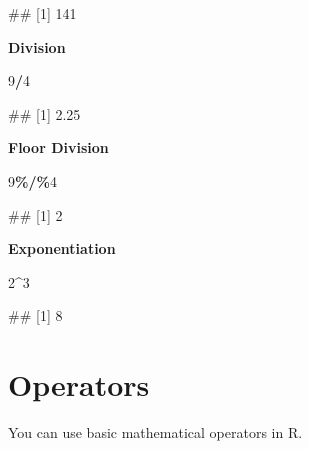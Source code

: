 \documentclass[
]{book}
\newenvironment{Shaded}{\begin{snugshade}}{\end{snugshade}}
\newcommand{\DecValTok}[1]{\textcolor[rgb]{0.00,0.00,0.81}{#1}}
\newcommand{\NormalTok}[1]{#1}
\newcommand{\SpecialCharTok}[1]{\textcolor[rgb]{0.81,0.36,0.00}{\textbf{#1}}}
\begin{document}
\begin{Shaded}
\begin{Highlighting}[]
\NormalTok{\#\# [1] 141}
\end{Highlighting}
\end{Shaded}

\textbf{Division}

\begin{Shaded}
\begin{Highlighting}[]
\DecValTok{9}\SpecialCharTok{/}\DecValTok{4}
\end{Highlighting}
\end{Shaded}

\begin{Shaded}
\begin{Highlighting}[]
\NormalTok{\#\# [1] 2.25}
\end{Highlighting}
\end{Shaded}

\textbf{Floor Division}

\begin{Shaded}
\begin{Highlighting}[]
\DecValTok{9}\SpecialCharTok{\%/\%}\DecValTok{4}
\end{Highlighting}
\end{Shaded}

\begin{Shaded}
\begin{Highlighting}[]
\NormalTok{\#\# [1] 2}
\end{Highlighting}
\end{Shaded}

\textbf{Exponentiation}

\begin{Shaded}
\begin{Highlighting}[]
\DecValTok{2}\SpecialCharTok{\^{}}\DecValTok{3}
\end{Highlighting}
\end{Shaded}

\begin{Shaded}
\begin{Highlighting}[]
\NormalTok{\#\# [1] 8}
\end{Highlighting}
\end{Shaded}

\hypertarget{operators}{%
\section{Operators}\label{operators}}

You can use basic mathematical operators in R.
\end{document}
